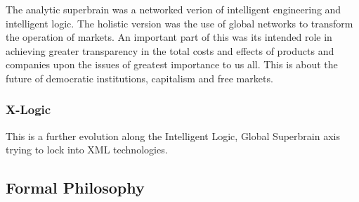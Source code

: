 \documentclass{rbjk}
\begin{document}
\begin{article}
The analytic superbrain was a networked verion of intelligent engineering and intelligent logic.
The holistic version was the use of global networks to transform the operation of markets.
An important part of this was its intended role in achieving greater transparency in the total costs and effects of products and companies upon the issues of greatest importance to us all.
This is about the future of democratic institutions, capitalism and free markets.

\subsubsection{X-Logic}

This is a further evolution along the Intelligent Logic, Global Superbrain axis trying to lock into XML technologies.

\subsection{Formal Philosophy}




%
%

\end{article}
\end{document}
